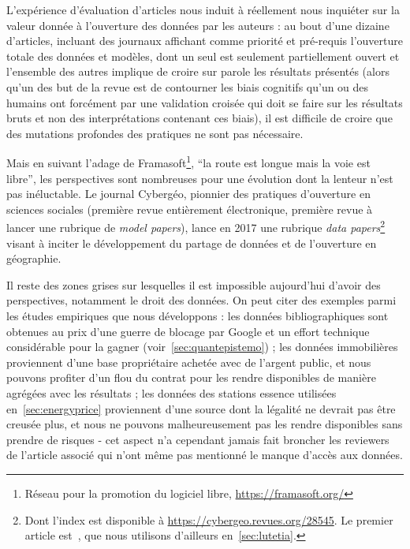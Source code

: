 L'expérience d'évaluation d'articles nous induit à réellement nous inquiéter sur la valeur donnée à l'ouverture des données par les auteurs : au bout d'une dizaine d'articles, incluant des journaux affichant comme priorité et pré-requis l'ouverture totale des données et modèles, dont un seul est seulement partiellement ouvert et l'ensemble des autres implique de croire sur parole les résultats présentés (alors qu'un des but de la revue est de contourner les biais cognitifs qu'un ou des humains ont forcément par une validation croisée qui doit se faire sur les résultats bruts et non des interprétations contenant ces biais), il est difficile de croire que des mutations profondes des pratiques ne sont pas nécessaire.


Mais en suivant l'adage de Framasoft\footnote{Réseau pour la promotion du logiciel libre, \url{https://framasoft.org/}}, ``la route est longue mais la voie est libre'', les perspectives sont nombreuses pour une évolution dont la lenteur n'est pas inéluctable. Le journal Cybergéo, pionnier des pratiques d'ouverture en sciences sociales (première revue entièrement électronique, première revue à lancer une rubrique de \emph{model papers}), lance en 2017 une rubrique \emph{data papers}\footnote{Dont l'index est disponible à \url{https://cybergeo.revues.org/28545}. Le premier article est~\cite{swerts2017database}, que nous utilisons d'ailleurs en~\ref{sec:lutetia}.} visant à inciter le développement du partage de données et de l'ouverture en géographie.


Il reste des zones grises sur lesquelles il est impossible aujourd'hui d'avoir des perspectives, notamment le droit des données. On peut citer des exemples parmi les études empiriques que nous développons : les données bibliographiques sont obtenues au prix d'une guerre de blocage par Google et un effort technique considérable pour la gagner (voir~\ref{sec:quantepistemo}) ; les données immobilières proviennent d'une base propriétaire achetée avec de l'argent public, et nous pouvons profiter d'un flou du contrat pour les rendre disponibles de manière agrégées avec les résultats ; les données des stations essence utilisées en~\ref{sec:energyprice} proviennent d'une source dont la légalité ne devrait pas être creusée plus, et nous ne pouvons malheureusement pas les rendre disponibles sans prendre de risques - cet aspect n'a cependant jamais fait broncher les reviewers de l'article associé qui n'ont même pas mentionné le manque d'accès aux données.


